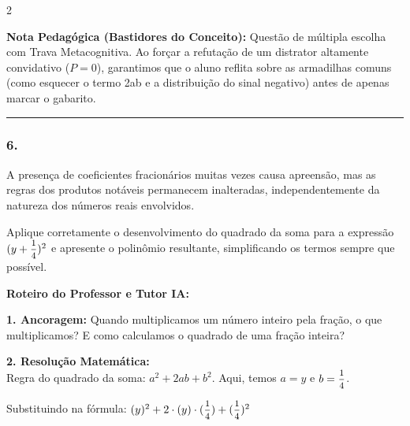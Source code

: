 \begin{multicols*}{2}
    \begin{boxexplicacao}
    \textbf{Nota Pedagógica (Bastidores do Conceito):} Questão de múltipla escolha com Trava Metacognitiva. Ao forçar a refutação de um distrator altamente convidativo ($P=0$), garantimos que o aluno reflita sobre as armadilhas comuns (como esquecer o termo 2ab e a distribuição do sinal negativo) antes de apenas marcar o gabarito.
    \end{boxexplicacao}
\fi

\par\vspace{\espacoQuestao}

\noindent\textcolor{CorLinha}{\rule{\linewidth}{0.5pt}} 
\par\vspace{\espacoPreQuestao}
\subsubsection*{6.} 
\begin{enunciadoLiteral}
A presença de coeficientes fracionários muitas vezes causa apreensão, mas as regras dos produtos notáveis permanecem inalteradas, independentemente da natureza dos números reais envolvidos.

Aplique corretamente o desenvolvimento do quadrado da soma para a expressão $ (y + \mfrac{1}{4})^2 $ e apresente o polinômio resultante, simplificando os termos sempre que possível.
\end{enunciadoLiteral}

\ifgabarito
    \begin{tcolorbox}[colback=CorTitUm!5, colframe=CorTitUm, boxrule=1pt, arc=4pt, left=6pt, right=6pt, top=6pt, bottom=6pt]
    \small\textbf{\textcolor{CorTitUm}{Roteiro do Professor e Tutor IA:}}\par\vspace{0.1cm}
    \color{CinzaEscuro}
    \textbf{1. Ancoragem:} Quando multiplicamos um número inteiro pela fração, o que multiplicamos? E como calculamos o quadrado de uma fração inteira?\par\vspace{0.1cm}
    \textbf{2. Resolução Matemática:}\\
    Regra do quadrado da soma: $ a^2 + 2ab + b^2 $.
    Aqui, temos $ a = y $ e $ b = \mfrac{1}{4} $.
    
    Substituindo na fórmula:
    $ (y)^2 + 2 \cdot (y) \cdot (\mfrac{1}{4}) + (\mfrac{1}{4})^2 $
    

\end{tcolorbox}
\end{multicols*}
